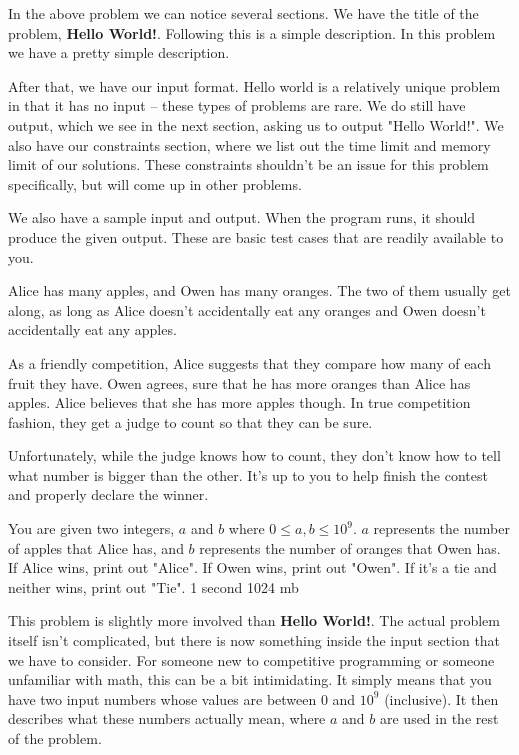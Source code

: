 \hrulefill

In the above problem we can notice several sections. We have the title of the problem, \textbf{Hello World!}. Following this is a simple description. In this problem we have a pretty simple description.

After that, we have our input format. Hello world is a relatively unique problem in that it has no input -- these types of problems are rare. We do still have output, which we see in the next section, asking us to output "Hello World!". We also have our constraints section, where we list out the time limit and memory limit of our solutions. These constraints shouldn't be an issue for this problem specifically, but will come up in other problems.

We also have a sample input and output. When the program runs, it should produce the given output. These are basic test cases that are readily available to you.

\hrulefill

{Alice has many apples, and Owen has many oranges. The two of them usually get along, as long as Alice doesn't accidentally eat any oranges and Owen doesn't accidentally eat any apples.

As a friendly competition, Alice suggests that they compare how many of each fruit they have. Owen agrees, sure that he has more oranges than Alice has apples. Alice believes that she has more apples though. In true competition fashion, they get a judge to count so that they can be sure.

Unfortunately, while the judge knows how to count, they don't know how to tell what number is bigger than the other. It's up to you to help finish the contest and properly declare the winner.}
{You are given two integers, $a$ and $b$ where $0 \leq a,b \leq 10^9$. $a$ represents the number of apples that Alice has, and $b$ represents the number of oranges that Owen has.}
{If Alice wins, print out "Alice". If Owen wins, print out "Owen". If it's a tie and neither wins, print out "Tie".}
{1 second}
{1024 mb}
{
}

\hrulefill

This problem is slightly more involved than \textbf{Hello World!}. The actual problem itself isn't complicated, but there is now something inside the input section that we have to consider. For someone new to competitive programming or someone unfamiliar with math, this can be a bit intimidating. It simply means that you have two input numbers whose values are between 0 and $10^9$ (inclusive). It then describes what these numbers actually mean, where $a$ and $b$ are used in the rest of the problem.

